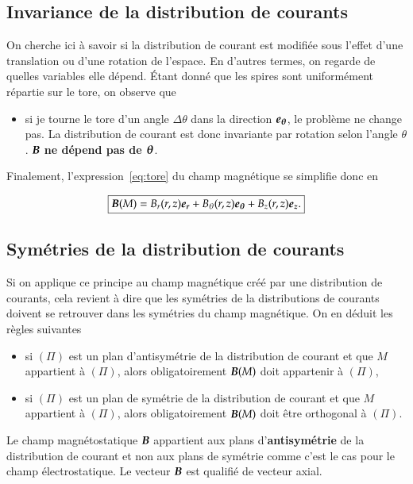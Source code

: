 \subsection{Invariance de la distribution de courants}
On cherche ici à savoir si la distribution de courant est modifiée sous l'effet
d'une translation ou d'une rotation de l'espace. En d'autres termes, on regarde
de quelles variables elle dépend. Étant donné que les spires sont uniformément
répartie sur le tore, on observe que

\begin{itemize}
	\item  si je tourne le tore d'un angle $\Delta \theta$ dans la
	  direction $\etheta$, le problème
	  ne change pas. La distribution de courant est donc invariante 
	  par rotation selon l'angle $\theta$. $\vecb$ \textbf{ne dépend pas de
	  $\mitbf{\theta}$}.
\end{itemize}

Finalement, l'expression~\ref{eq:tore} du champ magnétique se simplifie donc en 

\begin{equation*}
	\boxed{\vecb(M) = B_r(r,z)\er + B_\theta(r,z)\etheta + B_z(r,z)\ez.}
\end{equation*}
\subsection{Symétries de la distribution de courants}

Si on applique ce principe au champ magnétique créé par une distribution 
de courants, cela revient à dire que les symétries de la distributions de 
courants doivent se retrouver dans les symétries du champ magnétique. On en 
déduit les règles suivantes

\begin{defn}
\begin{itemize}
  \item si $(\Pi)$ est un plan d'antisymétrie de la distribution de courant et que 
    $M$ appartient à $(\Pi)$, alors obligatoirement $\vecb(M)$ doit 
    appartenir à $(\Pi)$,
  \item si $(\Pi)$ est un plan de symétrie de la distribution de courant 
    et que $M$ appartient à $(\Pi)$, alors obligatoirement $\vecb(M)$ doit 
    être orthogonal à $(\Pi)$.
\end{itemize}
\end{defn}

\begin{rem}
	Le champ magnétostatique $\vecb$ appartient aux plans d'\textbf{antisymétrie}
	de la distribution de courant et non aux plans de symétrie comme
	c'est le cas pour le champ électrostatique. Le vecteur $\vecb$ est 
	qualifié de vecteur axial.
\end{rem}

